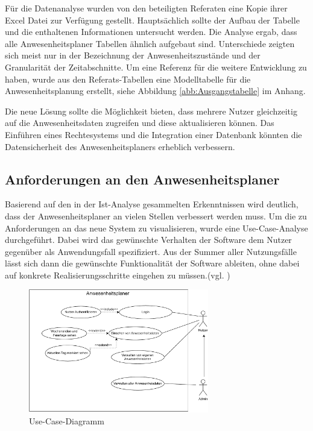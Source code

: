 Für die Datenanalyse wurden von den beteiligten Referaten eine Kopie ihrer Excel Datei zur Verfügung gestellt. Hauptsächlich sollte der Aufbau der Tabelle und die enthaltenen Informationen untersucht werden. Die Analyse ergab, dass alle Anwesenheitsplaner Tabellen ähnlich aufgebaut sind. Unterschiede zeigten sich meist nur in der Bezeichnung der Anwesenheitszustände und der Granularität der Zeitabschnitte. Um eine Referenz für die weitere Entwicklung zu haben, wurde aus den Referats-Tabellen eine Modelltabelle für die Anwesenheitsplanung erstellt, siehe Abbildung \ref{abb:Ausgangstabelle} im Anhang.

Die neue Lösung sollte die Möglichkeit bieten, dass mehrere Nutzer gleichzeitig auf die Anwesenheitsdaten zugreifen und diese aktualisieren können. Das Einführen eines Rechtesystems und die Integration einer Datenbank könnten die Datensicherheit des Anwesenheitsplaners erheblich verbessern.

\subsection{Anforderungen an den Anwesenheitsplaner}
\label{sec:Soll-Zustand}
Basierend auf den in der Ist-Analyse gesammelten Erkenntnissen wird deutlich, dass der Anwesenheitsplaner an vielen Stellen verbessert werden muss. Um die zu Anforderungen an das neue System zu visualisieren, wurde eine Use-Case-Analyse durchgeführt. Dabei wird das gewünschte Verhalten der Software dem Nutzer gegenüber als Anwendungsfall spezifiziert. Aus der Summer aller Nutzungsfälle lässt sich dann die gewünschte Funktionalität der Software ableiten, ohne dabei auf konkrete Realisierungsschritte eingehen zu müssen.(vgl. \cite[S. 164]{neumann-2002})

\begin{figure}[htb]
    \centering
    \includegraphics[width=0.7\textwidth,angle=0]{abb/use-case-diagramm.pdf}
    \caption[Use-Case-Diagramm]{Use-Case-Diagramm}
    \label{fig:Use-Case-Diagramm}
\end{figure}

